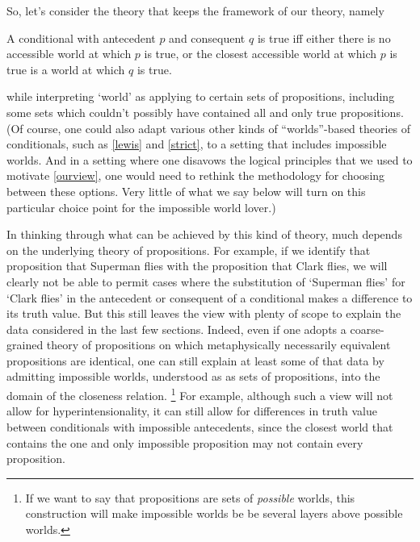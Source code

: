 \documentclass[If.tex]{subfiles}
\begin{document}
So, let's consider the theory that keeps the framework of our theory, namely 
\begin{prop} 
	\litem[\ref*{ourview}]
	A conditional with antecedent $p$ and consequent $q$ is true iff either there is no accessible world at which $p$ is true, or the closest accessible world at which $p$ is true is a world at which $q$ is true. 
\end{prop}
while interpreting ‘world’ as applying to certain sets of propositions, including some sets which couldn't possibly have contained all and only true propositions.  (Of course, one could also adapt various other kinds of “worlds”-based theories of conditionals, such as \ref{lewis} and \ref{strict}, to a setting that includes impossible worlds.  And in a setting where one disavows the logical principles that we used to motivate \ref{ourview}, one would need to rethink the methodology for choosing between these options.  Very little of what we say below will turn on this particular choice point for the impossible world lover.)  

In thinking through what can be achieved by this kind of theory, much depends on the underlying theory of propositions. For example, if we identify that proposition that Superman flies with the proposition that Clark flies, we will clearly not be able to permit cases where the substitution of ‘Superman flies’ for ‘Clark flies’ in the antecedent or consequent of a conditional makes a difference to its truth value.  But this still leaves the view with plenty of scope to explain the data considered in the last few sections.  Indeed, even if one adopts a coarse-grained theory of propositions on which metaphysically necessarily equivalent propositions are identical, one can still explain at least some of that data by admitting impossible worlds, understood as as sets of propositions, into the domain of the closeness relation.%
\footnote{If we want to say that propositions are sets of \emph{possible} worlds, this construction will make impossible worlds be be several layers above possible worlds.}  
For example, although such a view will not allow for hyperintensionality, it can still allow for differences in truth value between conditionals with impossible antecedents, since the closest world that contains the one and only impossible proposition may not contain every proposition.  
\end{document}
